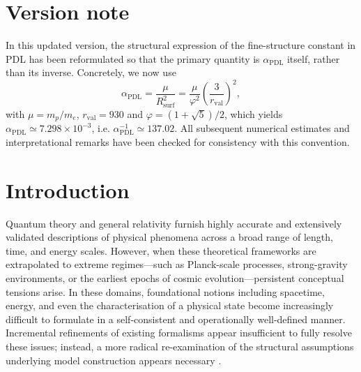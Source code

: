 \documentclass[11pt,a4paper]{article}
\numberwithin{equation}{section}
\begin{document}
\section*{Version note}

In this updated version, the structural expression of the fine-structure constant in PDL
has been reformulated so that the primary quantity is \(\alpha_{\text{PDL}}\) itself, rather than
its inverse.\@
Concretely, we now use
\[
  \alpha_{\text{PDL}}
  = \frac{\mu}{R_{\text{surf}}^2}
  = \frac{\mu}{\varphi^2}\left(\frac{3}{r_{\text{val}}}\right)^2,
\]
with \(\mu = m_p/m_e\), \(r_{\text{val}} = 930\) and \(\varphi = (1+\sqrt{5})/2\), which yields
\(\alpha_{\text{PDL}} \simeq 7.298\times 10^{-3}\), i.e. \(\alpha_{\text{PDL}}^{-1} \simeq 137.02\).\@
All subsequent numerical estimates and interpretational remarks have been checked for
consistency with this convention.

\newpage

\section{Introduction}
\label{sec:introduction}

Quantum theory and general relativity furnish highly accurate and extensively validated descriptions of physical phenomena across a broad range of length, time, and energy scales. However, when these theoretical frameworks are extrapolated to extreme regimes---such as Planck-scale processes, strong-gravity environments, or the earliest epochs of cosmic evolution---persistent conceptual tensions arise. In these domains, foundational notions including spacetime, energy, and even the characterisation of a physical state become increasingly difficult to formulate in a self-consistent and operationally well-defined manner. Incremental refinements of existing formalisms appear insufficient to fully resolve these issues; instead, a more radical re-examination of the structural assumptions underlying model construction appears necessary \cite{LaubscherCombinatorialProton2026,LaubscherLDP2026}.
\end{document}

